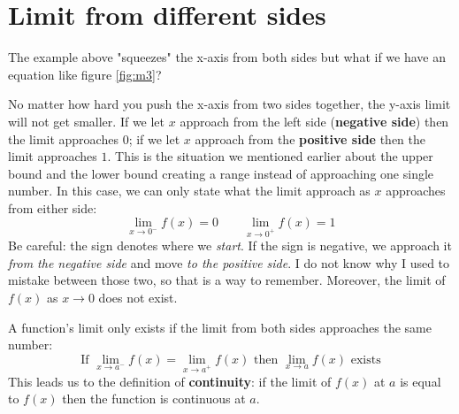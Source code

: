 \section{Limit from different sides}
The example above "squeezes" the x-axis from both sides but what if we have an equation like figure \ref{fig:m3}?

No matter how hard you push the x-axis from two sides together, the y-axis limit will not get smaller. If we let $x$ approach from the left side (\textbf{negative side}) then the limit approaches $0$; if we let $x$ approach from the \textbf{positive side} then the limit approaches $1$. This is the situation we mentioned earlier about the upper bound and the lower bound creating a range instead of approaching one single number. In this case, we can only state what the limit approach as $x$ approaches from either side:
\[
    \lim_{x\to0^-}f(x) = 0
    \qquad
    \lim_{x\to0^+}f(x) = 1
\]
Be careful: the sign denotes where we \textit{start}. If the sign is negative, we approach it \textit{from the negative side} and move \textit{to the positive side}. I do not know why I used to mistake between those two, so that is a way to remember. Moreover, the limit of $f(x)$ as $x\to0$ does not exist.

A function's limit only exists if the limit from both sides approaches the same number:
\[
    \text{If }
    \lim_{x\to a^-}f(x)
    = \lim_{x\to a^+}f(x)
    \text {  then }
    \lim_{x\to a}f(x) \text{ exists}
\]
This leads us to the definition of \textbf{continuity}: if the limit of $f(x)$ at $a$ is equal to $f(x)$ then the function is continuous at $a$.

